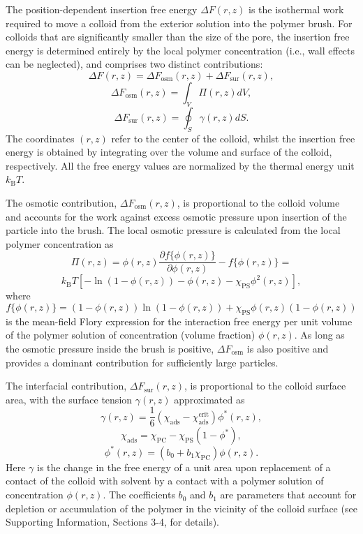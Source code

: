 \documentclass[12pt, a4paper]{article}
\begin{document}
The position-dependent insertion free energy $\Delta F(r,z)$ is the isothermal work required to move a colloid from the exterior solution into the polymer brush.
For colloids that are significantly smaller than the size of the pore, the insertion free energy is determined entirely by the local polymer concentration (i.e., wall effects can be neglected), and comprises two distinct contributions:
\begin{equation}
    \Delta F (r,z)= \Delta F_{\text{osm}}(r,z) + \Delta F_{\text{sur}}(r,z),
    \label{eq:Delta_F}
\end{equation}
$$
\Delta F_{\text{osm}}(r,z) = \int_{V} \Pi(r,z) dV,
$$
$$
\Delta F_{\text{sur}}(r,z) = \oint_{S} \gamma (r,z) dS.
$$
The coordinates $(r,z)$ refer to the center of the colloid, whilst the insertion free energy is obtained by integrating over the volume and surface of the colloid, respectively. All the free energy values are normalized by the thermal energy unit $k_{\text{B}}T$.

The osmotic contribution, $\Delta F_{\text{osm}}(r,z)$, is proportional to the colloid volume and accounts for the work against excess osmotic pressure upon insertion of the particle into the brush.
The local osmotic pressure is calculated from the local polymer concentration as
$$
\Pi(r,z)=  \phi(r,z)\frac{\partial f\{\phi(r,z)\}}{\partial \phi(r,z)} - f\{\phi(r,z)\}= 
$$
\begin{equation}
	k_{\text{B}}T[-\ln(1-\phi(r,z)) - \phi(r,z) -\chi_{\text{PS}}\phi^2(r,z)],
\end{equation}
where
$$
f\{\phi(r,z)\}=(1-\phi(r,z))\ln(1-\phi(r,z)) +\chi_{\text{PS}}\phi(r,z)(1-\phi(r,z))
$$
is the mean-field Flory expression for the interaction free energy per unit volume of the polymer solution of concentration (volume fraction) $\phi(r,z)$.
As long as the osmotic pressure inside the brush is positive, $\Delta F_{\text{osm}}$ is also positive and provides a dominant contribution for sufficiently large particles.

The interfacial contribution, $\Delta F_{\text{sur}}(r,z)$, is proportional to the colloid surface area, with the surface tension $\gamma (r,z)$ approximated as
\begin{equation}
    \gamma (r,z)= \frac{1}{6}(\chi_{\text{ads}} - \chi_{\text{ads}}^{\text{crit}})\phi^{\ast}(r,z),
    \label{eq:chi_ads} 
\end{equation}
$$
\chi_{\text{ads}} = \chi_{\text{PC}} - \chi_{\text{PS}}(1-\phi^{\ast}),
$$
$$
\phi^{\ast}(r,z)= (b_{0} + b_{1}\chi_{\text{PC}})\phi(r,z).
$$
Here $\gamma$ is the change in the free energy of a unit area upon replacement of a contact of the colloid with solvent by a contact with a polymer solution of concentration $\phi(r,z)$.
The coefficients $b_0$ and $b_1$ are parameters that account for depletion or accumulation of the polymer in the vicinity of the colloid surface (see Supporting Information, Sections 3-4, for details).
\end{document}
